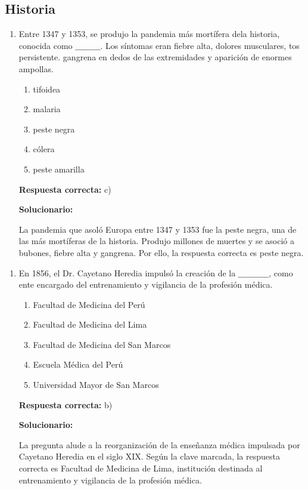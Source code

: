 \subsection*{Historia}

\begin{enumerate}
	
	\item Entre 1347 y 1353, se produjo la pandemia más mortífera dela historia, conocida como $\_\_\_\_\_\_\_\_\_$. Los síntomas eran fiebre alta, dolores musculares, tos persistente. gangrena en dedos de las extremidades y aparición de enormes ampollas.
	
	\begin{enumerate}[label=\alph*)]
		\item tifoidea
		\item malaria
		\item peste negra
		\item cólera 
		\item peste amarilla
	\end{enumerate}
	
	\textbf{Respuesta correcta:} c)
	
	\vspace{2mm}
	\textbf{Solucionario:}
	
	La pandemia que asoló Europa entre 1347 y 1353 fue la peste negra, una de las más mortíferas de la historia. Produjo millones de muertes y se asoció a bubones, fiebre alta y gangrena. Por ello, la respuesta correcta es peste negra.
	
\end{enumerate}

\begin{enumerate}[resume]
	
	\item En 1856, el Dr. Cayetano Heredia impulsó la creación de la $\_\_\_\_\_\_\_\_\_\_\_$, como ente encargado del entrenamiento y vigilancia de la profesión médica.
	
	\begin{enumerate}[label=\alph*)]
		\item Facultad de Medicina del Perú
		\item Facultad de Medicina del Lima
		\item Facultad de Medicina del San Marcos
		\item Escuela Médica del Perú
		\item Universidad Mayor de San Marcos
		
	\end{enumerate}
	
	\textbf{Respuesta correcta:} b)
	
	\vspace{2mm}
	\textbf{Solucionario:}
	
	La pregunta alude a la reorganización de la enseñanza médica impulsada por Cayetano Heredia en el siglo XIX. Según la clave marcada, la respuesta correcta es Facultad de Medicina de Lima, institución destinada al entrenamiento y vigilancia de la profesión médica.
	
\end{enumerate}


